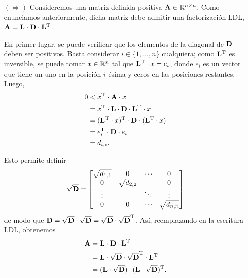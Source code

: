 \begin{itemize}
\item[$(\Rightarrow)$] Consideremos una matriz definida positiva $\mathbf{A} \in
    \mathbb{R}^{n \times n}$. Como enunciamos anteriormente, dicha matriz debe
    admitir una factorización LDL,
    $\mathbf{A} = \mathbf{L} \cdot \mathbf{D} \cdot \mathbf{L}^{\mathrm{T}}$.

    En primer lugar, se puede verificar que los elementos de la diagonal de
    $\mathbf{D}$ deben ser positivos.
    Basta considerar $i \in \{1, \dots, n\}$ cualquiera; como
    $\mathbf{L}^{\mathrm{T}}$ es inversible, se
    puede tomar $x \in \mathbb{R}^n$ tal que $\mathbf{L}^{\mathrm{T}} \cdot x = e_i$, donde
    $e_i$ es un vector que tiene un uno en la posición $i$-ésima y ceros en
    las posiciones restantes. Luego,
    \[ \begin{aligned}
        0 &< x^{\mathrm{T}} \cdot \mathbf{A} \cdot x \\
          &= x^{\mathrm{T}} \cdot \mathbf{L} \cdot \mathbf{D} \cdot \mathbf{L}^{\mathrm{T}} \cdot x \\
          &= (\mathbf{L}^{\mathrm{T}} \cdot x)^{\mathrm{T}} \cdot \mathbf{D} \cdot
             (\mathbf{L}^{\mathrm{T}} \cdot x) \\
          &= e_i^{\mathrm{T}} \cdot \mathbf{D} \cdot e_i \\
          &= d_{i,i}.
    \end{aligned} \]

    Esto permite definir
    \[ \mathbf{\sqrt{D}} = \begin{bmatrix}
        \sqrt{d_{1,1}} & 0              & \cdots & 0 \\
        0              & \sqrt{d_{2,2}} &        & 0 \\
        \vdots         &                & \ddots & \vdots \\
        0              & 0              & \cdots & \sqrt{d_{n,n}}
    \end{bmatrix} \]
    de modo que $\mathbf{D} = \mathbf{\sqrt{D}} \cdot \mathbf{\sqrt{D}} =
    \mathbf{\sqrt{D}} \cdot \mathbf{\sqrt{D}}^{\mathrm{T}}$. Así, reemplazando en la
    escritura LDL, obtenemos
    \[ \begin{aligned} \mathbf{A}
        &= \mathbf{L} \cdot \mathbf{D} \cdot \mathbf{L}^{\mathrm{T}} \\
        &= \mathbf{L} \cdot \mathbf{\sqrt{D}} \cdot \mathbf{\sqrt{D}}^{\mathrm{T}}
            \cdot \mathbf{L}^{\mathrm{T}} \\
        &= (\mathbf{L} \cdot \mathbf{\sqrt{D}}) \cdot
            (\mathbf{L} \cdot \mathbf{\sqrt{D}})^{\mathrm{T}}. \\
    \end{aligned} \]


\end{itemize}
